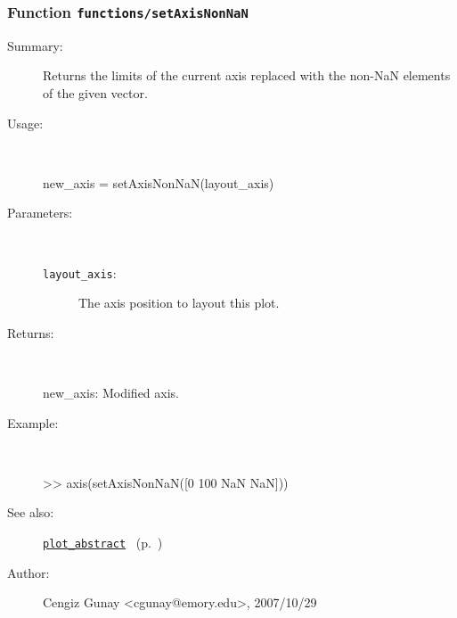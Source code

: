 \subsubsection[Function \texttt{setAxisNonNaN}]{Function \texttt{functions/setAxisNonNaN}}%
%
\label{ref_functions__setAxisNonNaN}%
\hypertarget{ref_functions__setAxisNonNaN}{}%
\begin{description}
\item[Summary:]Returns the limits of the current axis replaced with the non-NaN elements of the given vector.
%
\item[Usage:]~%
\begin{lyxcode}%
new\_axis = setAxisNonNaN(layout\_axis)
%
\end{lyxcode}%
%
%
\item[Parameters:]~
\begin{description}%
\item[\texttt{layout\_axis}:]
 The axis position to layout this plot. 
\end{description}%
%
\item[Returns:
]~

	new\_axis: Modified axis.
%
\item[Example:]~
\begin{lyxcode} >> axis(setAxisNonNaN([0 100 NaN NaN])) %
\\%
\end{lyxcode}
%
\item[See also:]%
\hyperlink{ref_plot_abstract}{\texttt{plot\_abstract}}%
\ (p.~\pageref{ref_plot_abstract})%
%
%
\item[Author:]%
Cengiz Gunay <cgunay@emory.edu>, 2007/10/29
%
\end{description}
\methodline%
